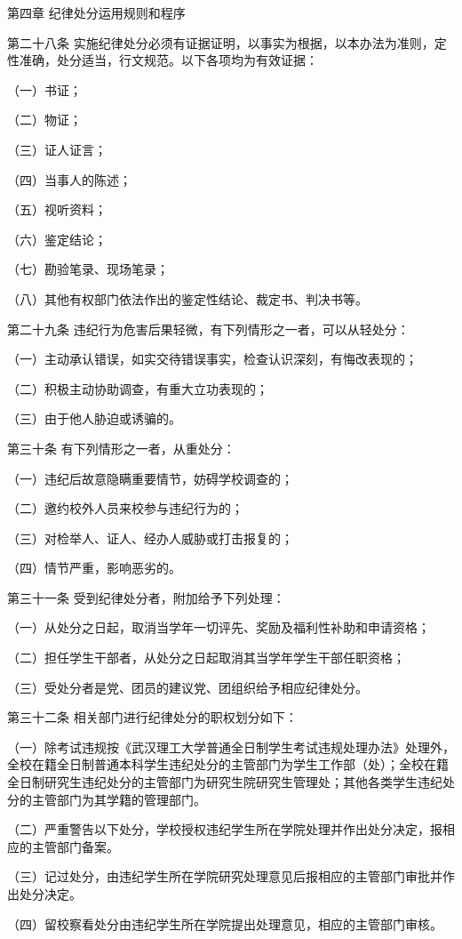 \documentclass[UTF8,12pt,a4paper]{report}
\begin{document}
第四章  纪律处分运用规则和程序

第二十八条  实施纪律处分必须有证据证明，以事实为根据，以本办法为准则，定性准确，处分适当，行文规范。以下各项均为有效证据：

（一）书证；

（二）物证；

（三）证人证言； 

（四）当事人的陈述；

（五）视听资料； 

（六）鉴定结论； 

（七）勘验笔录、现场笔录；

（八）其他有权部门依法作出的鉴定性结论、裁定书、判决书等。

第二十九条  违纪行为危害后果轻微，有下列情形之一者，可以从轻处分：

（一）主动承认错误，如实交待错误事实，检查认识深刻，有悔改表现的；

（二）积极主动协助调查，有重大立功表现的；

（三）由于他人胁迫或诱骗的。

第三十条  有下列情形之一者，从重处分：

（一）违纪后故意隐瞒重要情节，妨碍学校调查的；

（二）邀约校外人员来校参与违纪行为的；

（三）对检举人、证人、经办人威胁或打击报复的；

（四）情节严重，影响恶劣的。

第三十一条  受到纪律处分者，附加给予下列处理：

（一）从处分之日起，取消当学年一切评先、奖励及福利性补助和申请资格；

（二）担任学生干部者，从处分之日起取消其当学年学生干部任职资格；

（三）受处分者是党、团员的建议党、团组织给予相应纪律处分。

第三十二条  相关部门进行纪律处分的职权划分如下：

（一）除考试违规按《武汉理工大学普通全日制学生考试违规处理办法》处理外，全校在籍全日制普通本科学生违纪处分的主管部门为学生工作部（处）；全校在籍全日制研究生违纪处分的主管部门为研究生院研究生管理处；其他各类学生违纪处分的主管部门为其学籍的管理部门。

（二）严重警告以下处分，学校授权违纪学生所在学院处理并作出处分决定，报相应的主管部门备案。

（三）记过处分，由违纪学生所在学院研究处理意见后报相应的主管部门审批并作出处分决定。

（四）留校察看处分由违纪学生所在学院提出处理意见，相应的主管部门审核。
\end{document}
